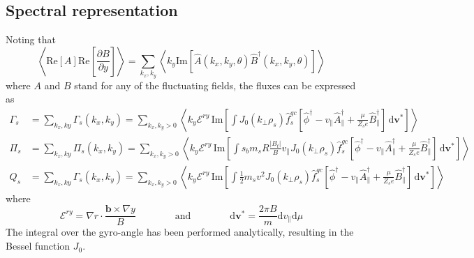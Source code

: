 \documentclass[a4paper]{report}
\begin{document}
\subsection{Spectral representation}
Noting that 
\begin{equation*}
\left< \textrm{Re}\left[ A \right] \textrm{Re}\left[\frac{\partial B}{\partial y}\right]\right>  = \sum_{k_x,k_y}\left<   k_y \textrm{Im}\left[\hat{A}(k_x,k_y,\theta)\hat{B}^\dagger(k_x,k_y,\theta)\right] \right>  
\end{equation*}
where $A$ and $B$ stand for any of the fluctuating fields, the fluxes can be expressed as
\begin{align*}
\Gamma_s & = \sum_{k_x,ky} \Gamma_s(k_x,k_y) = \sum_{k_x,k_y>0}  \left<k_y\mathcal{E}^{ry} \,\textrm{Im}\left[ \int J_0(k_\perp\rho_s)\hat{f}_s^{gc}\left[\hat{\phi}^\dagger-v_\parallel \hat{A}_\parallel^\dagger + \frac{\mu}{Z_s e}\hat{B}_\parallel^\dagger\right] 
 \,\textrm{d}\mathbf{v^*}\right]\right>\\
\Pi_s & = \sum_{k_x,ky} \Pi_s(k_x,k_y) =  \sum_{k_x,k_y>0}  \left<k_y\mathcal{E}^{ry} \,\textrm{Im}\left[ \int s_bm_sR\frac{|B_t|}{B}v_\parallel J_0(k_\perp\rho_s)\hat{f}_s^{gc}\left[\hat{\phi}^\dagger-v_\parallel \hat{A}_\parallel^\dagger + \frac{\mu}{Z_s e}\hat{B}_\parallel^\dagger\right] 
\,\textrm{d}\mathbf{v^*}\right]\right> \\
Q_s & = \sum_{k_x,ky} \Gamma_s(k_x,k_y) = \sum_{k_x,k_y>0}  \left<k_y\mathcal{E}^{ry} \,\textrm{Im}\left[\int \frac{1}{2}m_sv^2 J_0(k_\perp\rho_s)\hat{f}_s^{gc}\left[\hat{\phi}^\dagger-v_\parallel \hat{A}_\parallel^\dagger + \frac{\mu}{Z_s e}\hat{B}_\parallel^\dagger\right] 
\,\textrm{d}\mathbf{v^*}\right]\right>
\end{align*}
where 
\begin{equation*}
\mathcal{E}^{ry}= \nabla r \cdot \frac{\mathbf{b}\times \nabla y}{B} \qquad \qquad \textrm{and} \qquad \qquad \textrm{d}\mathbf{v^*}=\frac{2\pi B}{m}\textrm{d}v_\parallel\textrm{d}\mu
\end{equation*}
The integral over the gyro-angle has been performed analytically, resulting in the Bessel function $J_0$. 
\end{document}
